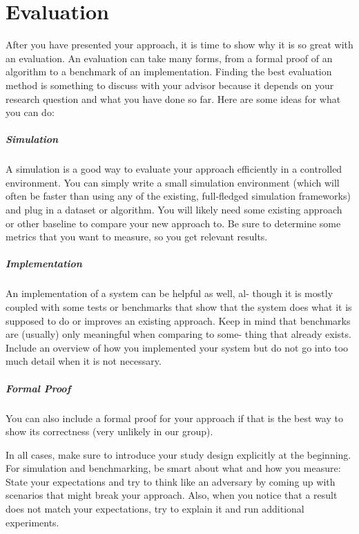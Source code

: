 \chapter{Evaluation}\label{sec:evaluation}
After you have presented your approach, it is time to show why it is so great with an evaluation. An evaluation can take many forms, from a formal proof of an algorithm to a benchmark of an implementation. Finding the best evaluation method is something to discuss with your advisor because it depends on your research question and what you have done so far. Here are some ideas for what you can do:

\paragraph{Simulation} A simulation is a good way to evaluate your approach efficiently in a controlled environment. You can simply write a small simulation environment (which will often be faster than using any of the existing, full-fledged simulation frameworks) and plug in a dataset or algorithm. You will likely need some existing approach or other baseline to compare your new approach to. Be sure to determine some metrics that you want to measure, so you get relevant results.
\paragraph{Implementation} An implementation of a system can be helpful as well, al- though it is mostly coupled with some tests or benchmarks that show that the system does what it is supposed to do or improves an existing approach. Keep in mind that benchmarks are (usually) only meaningful when comparing to some- thing that already exists. Include an overview of how you implemented your system but do not go into too much detail when it is not necessary.
\paragraph{Formal Proof} You can also include a formal proof for your approach if that is the best way to show its correctness (very unlikely in our group).

In all cases, make sure to introduce your study design explicitly at the beginning. For simulation and benchmarking, be smart about what and how you measure: State your expectations and try to think like an adversary by coming up with scenarios that might break your approach. Also, when you notice that a result does not match your expectations, try to explain it and run additional experiments.